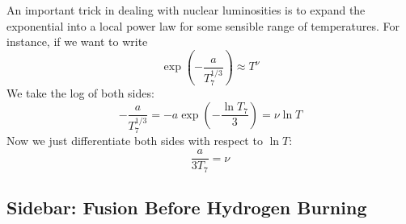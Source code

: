 \documentclass[10pt]{article}
\numberwithin{equation}{section}
\newcommand{\n}{\noindent}
\begin{document}
  \n An important trick in dealing with nuclear luminosities is to
  expand the exponential into a local power law for some sensible
  range of temperatures. For instance, if we want to write
  \begin{equation}
    \label{eq:308}
    \exp\left(-\frac{a}{T_7^{1/3}}\right)\approx T^{\nu}
  \end{equation}
  We take the log of both sides:
  \begin{equation}
    \label{eq:309}
    -\frac{a}{T_7^{1/3}}=-a\exp\left(-\frac{\ln T_7}{3}\right)=\nu\ln T
  \end{equation}
  Now we just differentiate both sides with respect to $\ln T$:
  \begin{equation}
    \label{eq:310}
    \boxed{\frac{a}{3T_7}=\nu}
  \end{equation}

  \subsection{Sidebar: Fusion Before Hydrogen Burning}
  \label{sec:deut-main-sequ}
\end{document}
